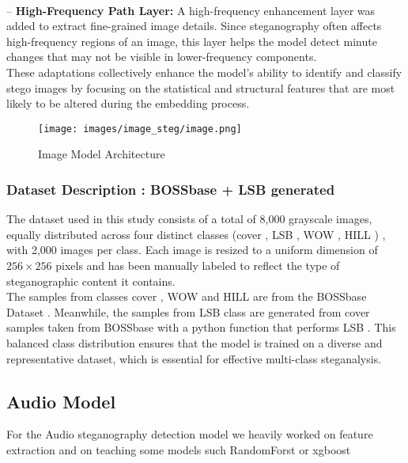 \documentclass[12pt]{article}
\begin{document}
\vspace{0.1cm} \\

-- \textbf{High-Frequency Path Layer:} A high-frequency enhancement layer was added to extract fine-grained image details. Since steganography often affects high-frequency regions of an image, this layer helps the model detect minute changes that may not be visible in lower-frequency components.  \vspace{0.3cm}\\
These adaptations collectively enhance the model’s ability to identify and classify stego images by focusing on the statistical and structural features that are most likely to be altered during the embedding process.

\begin{figure}[H]
    \centering
    \texttt{[image: images/image\_steg/image.png]}
    \caption{Image Model Architecture }
\end{figure}


\subsubsection{Dataset Description : BOSSbase + LSB generated}
The dataset used in this study consists of a total of 8,000 grayscale images, equally distributed across four distinct classes (cover , LSB , WOW , HILL ) , with 2,000 images per class. Each image is resized to a uniform dimension of $256 \times 256$ pixels and has been manually labeled to reflect the type of steganographic content it contains.\vspace{0.3cm} \\
The samples from classes cover , WOW and HILL are from the BOSSbase Dataset . Meanwhile, the samples from LSB class are generated from cover samples taken from BOSSbase with a python function that performs LSB . 
This balanced class distribution ensures that the model is trained on a diverse and representative dataset, which is essential for effective multi-class steganalysis.

\subsection{Audio Model}
For the Audio steganography detection model we heavily worked on feature extraction and on teaching some models such RandomForst or xgboost
\end{document}
